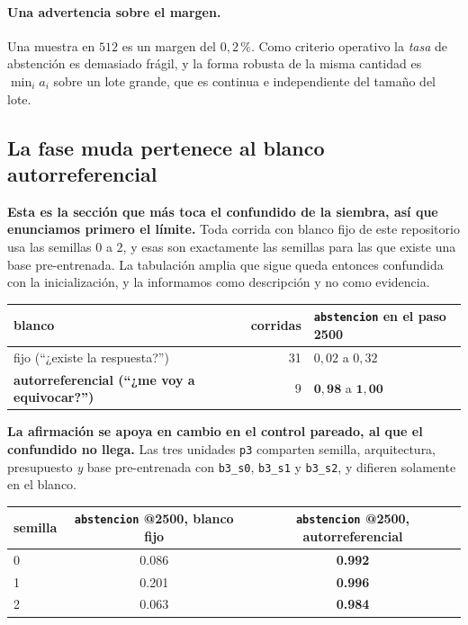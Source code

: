 \documentclass[11pt,a4paper]{article}
\begin{document}
\paragraph{Una advertencia sobre el margen.} Una muestra en $512$ es un margen del $0{,}2\,\%$. Como
criterio operativo la \emph{tasa} de abstención es demasiado frágil, y la forma robusta de la misma
cantidad es $\min_i a_i$ sobre un lote grande, que es continua e independiente del tamaño del lote.

\subsection{La fase muda pertenece al blanco autorreferencial}
\label{sec:exclusiva}

\textbf{Esta es la sección que más toca el confundido de la siembra, así que enunciamos primero el
límite.} Toda corrida con blanco fijo de este repositorio usa las semillas $0$ a $2$, y esas son
exactamente las semillas para las que existe una base pre-entrenada. La tabulación amplia que sigue
queda entonces confundida con la inicialización, y la informamos como descripción y no como evidencia.

\begin{center}
\begin{tabular}{lrl}
\toprule
blanco & corridas & \texttt{abstencion} en el paso 2500 \\
\midrule
fijo (``¿existe la respuesta?'') & 31 & $0{,}02$ a $0{,}32$ \\
\textbf{autorreferencial (``¿me voy a equivocar?'')} & 9 & $\mathbf{0{,}98}$ a $\mathbf{1{,}00}$ \\
\bottomrule
\end{tabular}
\end{center}

\textbf{La afirmación se apoya en cambio en el control pareado, al que el confundido no llega.} Las tres
unidades \texttt{p3} comparten semilla, arquitectura, presupuesto \emph{y} base pre-entrenada con
\texttt{b3\_s0}, \texttt{b3\_s1} y \texttt{b3\_s2}, y difieren solamente en el blanco.

\begin{center}
\begin{tabular}{lcc}
\toprule
semilla & \texttt{abstencion} @2500, blanco fijo & \texttt{abstencion} @2500, autorreferencial \\
\midrule
0 & 0.086 & \textbf{0.992} \\
1 & 0.201 & \textbf{0.996} \\
2 & 0.063 & \textbf{0.984} \\
\bottomrule
\end{tabular}
\end{center}
\end{document}
